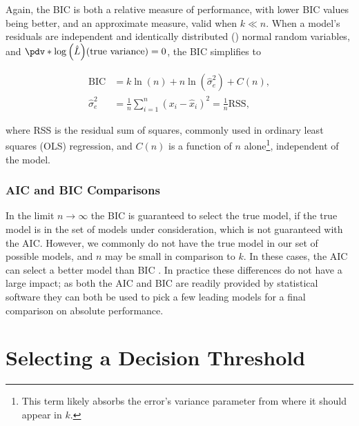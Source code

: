 Again, the BIC is both a relative measure of performance,
with lower BIC values being better,
and an approximate measure, valid when $k \ll n$.
When a model's residuals are independent and identically distributed (\iid) normal random variables,
and $\pdv*{\log\left(\hat{L}\right)}{\left(\text{true variance}\right)} = 0$,
the BIC simplifies \cite{priestley1981spectral} to

\begin{subequations} \label{eq:BIC_gaus_errors}
\begin{align}
\text{BIC} &= k\ln\left(n\right) + n \ln\left(\hat{\sigma}_{e}^{2}\right) + C\left(n\right), \label{eq:BIC_gaus_errors:BIC} \\
\hat{\sigma}_{e}^{2} &= \frac{1}{n} \sum_{i=1}^{n} \left(x_{i} - \hat{x}_{i}\right)^{2} = \frac{1}{n} \text{RSS}, \label{eq:BIC_gaus_errors:RSS}
\end{align}
\end{subequations}

\noindent where RSS is the residual sum of squares,
commonly used in ordinary least squares (OLS) regression,
and $C\left(n\right)$ is a function of $n$ alone\footnote{This term
likely absorbs the error's variance parameter from where it should appear in $k$.}, independent of the model.

\subsubsection{AIC and BIC Comparisons}
\label{ml_general:eval:BIC_comp_AIC}

In the limit $n \to \infty$ the BIC is guaranteed to select the true model,
if the true model is in the set of models under consideration,
which is not guaranteed with the AIC.
However, we commonly do not have the true model in our set of possible models,
and $n$ may be small in comparison to $k$.
In these cases, the AIC can select a better model than BIC
\cite{1311138,doi:10.1177/0049124104268644,Vrieze_2012,8498082}.
In practice these differences do not have a large impact;
as both the AIC and BIC are readily provided by statistical software
they can both be used to pick a few leading models
for a final comparison on absolute performance.

\section{Selecting a Decision Threshold}
\label{ml_general:decision_threshold}

